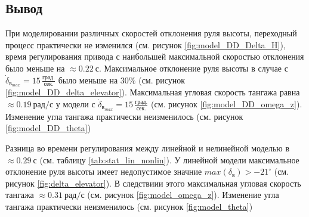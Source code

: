 \subsection{Вывод}
При моделировании различных скоростей отклонения руля высоты, переходный
процесс практически не изменился (см. рисунок \ref{fig:model_DD_Delta_H}), время
регулирования привода с наибольшей максимальной скоростью отклонения было
меньше на $\approx 0.22\ с$. Максимальное отклонение руля высоты в случае с
$\dot{\delta}_{{в}_{max}} = 15\, \frac{\text{град.}}{\text{сек.}}$ было меньше
на $30 \%$ (см. рисунок \ref{fig:model_DD_delta_elevator}). Максимальная
угловая скорость тангажа равна $\approx 0.19\ \text{рад/с}$ у модели с $\dot{\delta}_{{в}_{max}} = 15\,
\frac{\text{град.}}{\text{сек.}}$ (см. рисунок \ref{fig:model_DD_omega_z}).
Изменение угла тангажа практически неизменилось (см. рисунок
\ref{fig:model_DD_theta})

Разница во времени регулирования между линейной и нелинейной моделью в $\approx
0.29\ с$ (см. таблицу \ref{tab:stat_lin_nonlin}). У линейной модели
максимальное отклонение руля высоты имеет недопустимое значние $max(\delta_{в})
> -21^\circ$ (см. рисунок \ref{fig:delta_elevator}). В следствиии этого
максимальная угловая скорость тангажа $\approx 0.31\ \text{рад/с}$ (см. рисунок
\ref{fig:model_omega_z}). Изменение угла тангажа
практически неизменилось (см. рисунок \ref{fig:model_theta})

